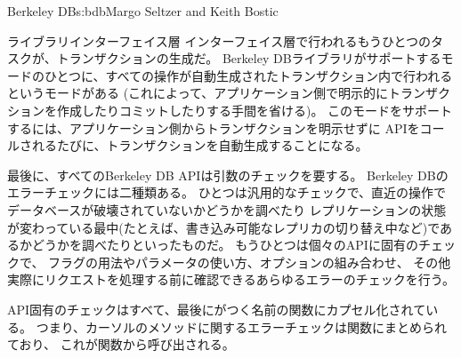 \begin{aosachapter}{Berkeley DB}{s:bdb}{Margo Seltzer and Keith Bostic}
\begin{aosasect1}{ライブラリインターフェイス層}
インターフェイス層で行われるもうひとつのタスクが、トランザクションの生成だ。
Berkeley DBライブラリがサポートするモードのひとつに、すべての操作が自動生成されたトランザクション内で行われるというモードがある
(これによって、アプリケーション側で明示的にトランザクションを作成したりコミットしたりする手間を省ける)。
このモードをサポートするには、アプリケーション側からトランザクションを明示せずに
APIをコールされるたびに、トランザクションを自動生成することになる。

最後に、すべてのBerkeley DB APIは引数のチェックを要する。
Berkeley DBのエラーチェックには二種類ある。
ひとつは汎用的なチェックで、直近の操作でデータベースが破壊されていないかどうかを調べたり
レプリケーションの状態が変わっている最中(たとえば、書き込み可能なレプリカの切り替え中など)であるかどうかを調べたりといったものだ。
もうひとつは個々のAPIに固有のチェックで、
フラグの用法やパラメータの使い方、オプションの組み合わせ、
その他実際にリクエストを処理する前に確認できるあらゆるエラーのチェックを行う。

API固有のチェックはすべて、最後にがつく名前の関数にカプセル化されている。
つまり、カーソルのメソッドに関するエラーチェックは関数にまとめられており、
これが関数から呼び出される。


\end{aosasect1}
\end{aosachapter}
